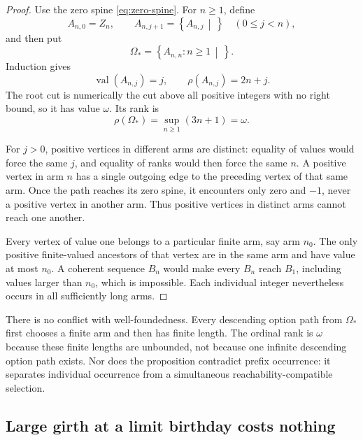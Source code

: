 \documentclass[11pt,a4paper]{article}
\numberwithin{equation}{section}
\theoremstyle{definition}
\theoremstyle{remark}
\newcommand{\val}{\operatorname{val}}
\newcommand{\rk}{\rho}
\newcommand{\cut}[2]{\left\{#1\,\middle|\,#2\right\}}
\begin{document}
\begin{proof}
Use the zero spine \eqref{eq:zero-spine}. For $n\geq1$, define
\begin{equation}
 A_{n,0}=Z_n,\qquad
 A_{n,j+1}=\cut{A_{n,j}}{}\quad(0\leq j<n),
\end{equation}
and then put
\begin{equation}
 \Omega_* =\cut{A_{n,n}:n\geq1}{}.
\end{equation}
Induction gives
\begin{equation}
 \val(A_{n,j})=j,\qquad \rk(A_{n,j})=2n+j.
\end{equation}
The root cut is numerically the cut above all positive integers with no right
bound, so it has value $\omega$. Its rank is
\begin{equation}
 \rk(\Omega_*)=\sup_{n\geq1}(3n+1)=\omega.
\end{equation}

For $j>0$, positive vertices in different arms are distinct: equality of values
would force the same $j$, and equality of ranks would then force the same $n$.
A positive vertex in arm $n$ has a single outgoing edge to the preceding
vertex of that same arm. Once the path reaches its zero spine, it encounters
only zero and $-1$, never a positive vertex in another arm. Thus positive
vertices in distinct arms cannot reach one another.

Every vertex of value one belongs to a particular finite arm, say arm $n_0$.
The only positive finite-valued ancestors of that vertex are in the same arm
and have value at most $n_0$. A coherent sequence $B_n$ would make every $B_n$
reach $B_1$, including values larger than $n_0$, which is impossible. Each
individual integer nevertheless occurs in all sufficiently long arms.
\end{proof}

There is no conflict with well-foundedness. Every descending option path from
$\Omega_*$ first chooses a finite arm and then has finite length. The ordinal
rank is $\omega$ because these finite lengths are unbounded, not because one
infinite descending option path exists. Nor does the proposition contradict
prefix occurrence: it separates individual occurrence from a simultaneous
reachability-compatible selection.

\subsection{Large girth at a limit birthday costs nothing}
\end{document}
